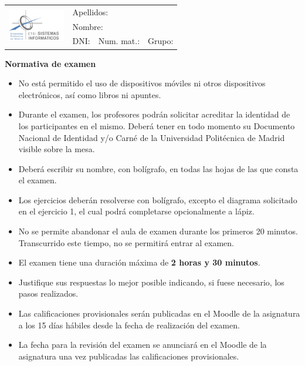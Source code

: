 \documentclass[10pt,a4paper,addpoints,answers]{exam}
\def\studentdata{
    \begin{table}[t]
        \renewcommand{\arraystretch}{1.2}
        \small
        \centering
        \begin{tabular}{|l|p{4cm}|p{4cm}|p{2.5cm}|}
            \hline
            \multirow{3}{*}{\includegraphics[width=2.5cm]{logos/etsisi.png}} & \multicolumn{3}{l|}{Apellidos:} \\ \cline{2-4} 
                                                                      & \multicolumn{3}{l|}{Nombre:}    \\ \cline{2-4} 
                                                                      & DNI:  & Num. mat.: & Grupo: \\ \hline
        \end{tabular}%
    \end{table}
}
\begin{document}
\studentdata

\begin{center}\textbf{Normativa de examen}\end{center}
\begin{itemize}
    \item No está permitido el uso de dispositivos móviles ni otros dispositivos electrónicos, así como libros ni apuntes.
    \item Durante el examen, los profesores podrán solicitar acreditar la identidad de los participantes en el mismo. Deberá tener en todo momento su Documento Nacional de Identidad y/o Carné de la Universidad Politécnica de Madrid visible sobre la mesa.
    \item Deberá escribir su nombre, con bolígrafo, en todas las hojas de las que consta el examen.
    \item Los ejercicios deberán resolverse con bolígrafo, excepto el diagrama solicitado en el ejercicio 1, el cual podrá completarse opcionalmente a lápiz.
    \item No se permite abandonar el aula de examen durante los primeros 20 minutos. Transcurrido este tiempo, no se permitirá entrar al examen. 
    \item El examen tiene una duración máxima de \textbf{2 horas y 30 minutos}. 
    \item Justifique sus respuestas lo mejor posible indicando, si fuese necesario, los pasos realizados.
    \item Las calificaciones provisionales serán publicadas en el Moodle de la asignatura a los 15 días hábiles desde la fecha de realización del examen.
    \item La fecha para la revisión del examen se anunciará en el Moodle de la asignatura una vez publicadas las calificaciones provisionales.
\end{itemize}
\newpage
\end{document}
